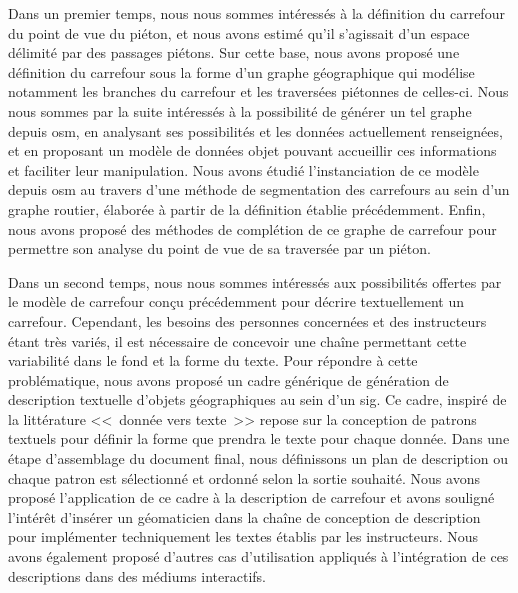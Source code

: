 \newpar{}


Dans un premier temps, nous nous sommes intéressés à la définition du carrefour du point de vue du piéton, et nous avons estimé qu'il s'agissait d'un espace délimité par des passages piétons. Sur cette base, nous avons proposé une définition du carrefour sous la forme d'un graphe géographique qui modélise notamment les branches du carrefour et les traversées piétonnes de celles-ci. Nous nous sommes par la suite intéressés à la possibilité de générer un tel graphe depuis \gls{osm}, en analysant ses possibilités et les données actuellement renseignées, et en proposant un modèle de données objet pouvant accueillir ces informations et faciliter leur manipulation. Nous avons étudié l'instanciation de ce modèle depuis \gls{osm} au travers d'une méthode de segmentation des carrefours au sein d'un graphe routier, élaborée à partir de la définition établie précédemment. Enfin, nous avons proposé des méthodes de complétion de ce graphe de carrefour pour permettre son analyse du point de vue de sa traversée par un piéton.

\newpar{}


Dans un second temps, nous nous sommes intéressés aux possibilités offertes par le modèle de carrefour conçu précédemment pour décrire textuellement un carrefour. Cependant, les besoins des personnes concernées et des instructeurs étant très variés, il est nécessaire de concevoir une chaîne permettant cette variabilité dans le fond et la forme du texte. Pour répondre à cette problématique, nous avons proposé un cadre générique de génération de description textuelle d'objets géographiques au sein d'un \gls{sig}. Ce cadre, inspiré de la littérature <<~donnée vers texte~>> repose sur la conception de patrons textuels pour définir la forme que prendra le texte pour chaque donnée. Dans une étape d'assemblage du document final, nous définissons un plan de description ou chaque patron est sélectionné et ordonné selon la sortie souhaité. Nous avons proposé l'application de ce cadre à la description de carrefour et avons souligné l'intérêt d'insérer un géomaticien dans la chaîne de conception de description pour implémenter techniquement les textes établis par les instructeurs. Nous avons également proposé d'autres cas d'utilisation appliqués à l'intégration de ces descriptions dans des médiums interactifs.

\newpar{}


